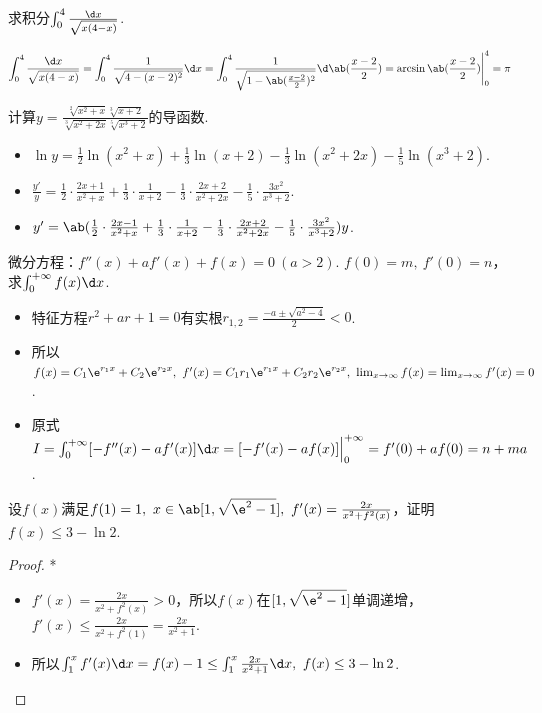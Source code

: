 \begin{problem}
    求积分$\int_0^4\frac{\d x}{\sqrt{x(4-x)}}$.
\end{problem}
\begin{solution}
    \[\int_0^4\frac{\d x}{\sqrt{x(4-x)}}=\int_0^4\frac{1}{\sqrt{4-(x-2)^2}}\d x=\int_0^4\frac{1}{\sqrt{1-\ab(\frac{x-2}{2})^2}}\d\ab(\frac{x-2}{2})=\arcsin\ab(\frac{x-2}{2})\Bigg|_0^4=\pi\]
\end{solution}

\begin{problem}
    计算$y=\frac{\sqrt[2]{x^2+x}\sqrt[3]{x+2}}{\sqrt[3]{x^2+2x}\sqrt[5]{x^3+2}}$的导函数.
\end{problem}
\begin{solution}
\begin{itemize}
    \item $\ln y=\frac12\ln(x^2+x)+\frac13\ln(x+2)-\frac13\ln(x^2+2x)-\frac15\ln(x^3+2)$.
    \item $\frac{y'}{y}=\frac12\cdot\frac{2x+1}{x^2+x}+\frac13\cdot\frac{1}{x+2}-\frac13\cdot\frac{2x+2}{x^2+2x}-\frac15\cdot\frac{3x^2}{x^3+2}$.
    \item $y'=\ab(\frac12\cdot\frac{2x-1}{x^2+x}+\frac13\cdot\frac{1}{x+2}-\frac13\cdot\frac{2x+2}{x^2+2x}-\frac15\cdot\frac{3x^2}{x^3+2})y$.
\end{itemize}
\end{solution}

\begin{problem}
    微分方程：$f''(x)+af'(x)+f(x)=0\ (a>2)$. $f(0)=m,\ f'(0)=n$，求$\int_0^{+\infty}f(x)\d x$.
\end{problem}
\begin{solution}
\begin{itemize}
    \item 特征方程$r^2+ar+1=0$有实根$r_{1,2}=\frac{-a\pm\sqrt{a^2-4}}{2}<0$.
    \item 所以$f(x)=C_1\e^{r_1x}+C_2\e^{r_2x},\ f'(x)=C_1r_1\e^{r_1x}+C_2r_2\e^{r_2x},\ \lim_{x\to\infty}f(x)=\lim_{x\to\infty}f'(x)=0$.
    \item 原式$I=\int_0^{+\infty}[-f''(x)-af'(x)]\d x=[-f'(x)-af(x)]\Big|_0^{+\infty}=f'(0)+af(0)=n+ma$.
\end{itemize}
\end{solution}

\begin{problem}
    设$f(x)$满足$f(1)=1,\ x\in\ab[1,\sqrt{\e^2-1}],\ f'(x)=\frac{2x}{x^2+f^2(x)}$，证明$f(x)\leq 3-\ln 2$.
\end{problem}
\begin{solution}
\begin{proof}*
\begin{itemize}
    \item $f'(x)=\frac{2x}{x^2+f^2(x)}>0$，所以$f(x)$在$[1,\sqrt{\e^2-1}]$单调递增，$f'(x)\leq\frac{2x}{x^2+f^2(1)}=\frac{2x}{x^2+1}$.
    \item 所以$\int_1^x f'(x)\d x=f(x)-1\leq\int_1^x\frac{2x}{x^2+1}\d x,\ f(x)\leq 3-\ln 2$.\QED
\end{itemize}
\end{proof}
\end{solution}


\vfill
{}